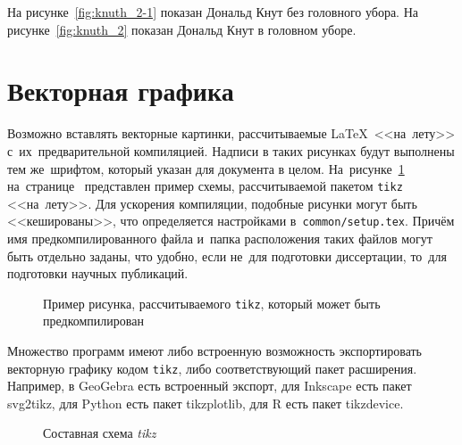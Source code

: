 На рисунке~\cref{fig:knuth_2-1} показан Дональд Кнут без головного убора.
На рисунке~\cref{fig:knuth_2}
показан Дональд Кнут в головном уборе.

\section{Векторная графика}\label{sec:ch2/vector}

Возможно вставлять векторные картинки, рассчитываемые \LaTeX\ <<на~лету>>
с~их~предварительной компиляцией. Надписи в таких рисунках будут выполнены
тем же~шрифтом, который указан для документа в целом.
На~рисунке~\cref{fig:tikz_example} на~странице~\pageref{fig:tikz_example}
представлен пример схемы, рассчитываемой пакетом \verb|tikz| <<на~лету>>.
Для ускорения компиляции, подобные рисунки могут быть <<кешированы>>, что
определяется настройками в~\verb|common/setup.tex|.
Причём имя предкомпилированного
файла и~папка расположения таких файлов могут быть отдельно заданы,
что удобно, если не~для подготовки диссертации,
то~для подготовки научных публикаций.
\begin{figure}[ht]
    \legend{}
    \caption[Пример \texttt{tikz} схемы]{Пример рисунка, рассчитываемого
        \texttt{tikz}, который может быть предкомпилирован}\label{fig:tikz_example}
\end{figure}

Множество программ имеют либо встроенную возможность экспортировать векторную
графику кодом \verb|tikz|, либо соответствующий пакет расширения.
Например, в GeoGebra есть встроенный экспорт,
для Inkscape есть пакет svg2tikz,
для Python есть пакет tikzplotlib,
для R есть пакет tikzdevice.

\begin{figure}[htbp]
                \caption{Составная схема \textit{tikz}}\label{fig:scheme-tikz}
\end{figure}

